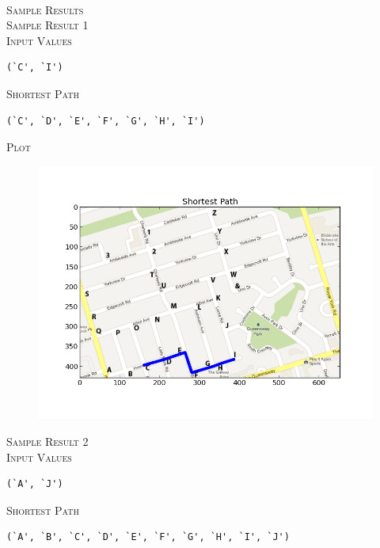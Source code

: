 \documentclass[pdftex,12pt,a4paper]{article}
\newcommand{\nspace}{\\[0.25cm]}
\newcommand{\lspace}{\\[0.50cm]}
\begin{document}
\hfill \lspace

\textsc{\Large Sample Results} \hfill \nspace

\textsc{\large Sample Result 1} \hfill \nspace

\textsc{Input Values} \hfill \nspace

\begin{verbatim}
(`C', `I')
\end{verbatim}


\textsc{Shortest Path} \hfill \nspace

\begin{verbatim}
(`C', `D', `E', `F', `G', `H', `I')
\end{verbatim}


\textsc{Plot}

\begin{figure}[h!]
  \centering
	\includegraphics[scale=0.60]{img/dijkstra_test_1.png}
\end{figure}



\newpage
\textsc{\large Sample Result 2} \hfill \nspace

\textsc{Input Values} \hfill \nspace

\begin{verbatim}
(`A', `J')
\end{verbatim}


\textsc{Shortest Path} \hfill \nspace

\begin{verbatim}
(`A', `B', `C', `D', `E', `F', `G', `H', `I', `J')
\end{verbatim}
\end{document}
